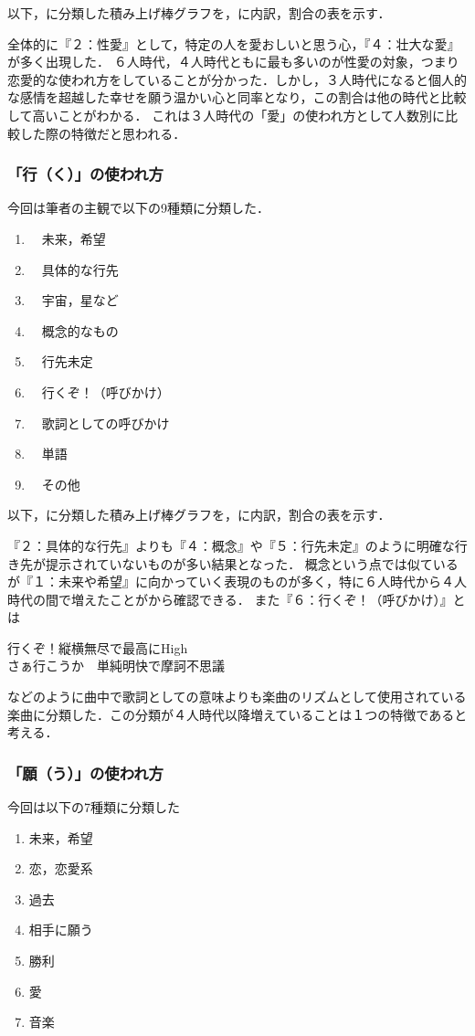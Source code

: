 以下，に分類した積み上げ棒グラフを，\protect{}に内訳，割合の表を示す．

全体的に『２：性愛』として，特定の人を愛おしいと思う心，『４：壮大な愛』が多く出現した．
６人時代，４人時代ともに最も多いのが性愛の対象，つまり恋愛的な使われ方をしていることが分かった．しかし，３人時代になると個人的な感情を超越した幸せを願う温かい心と同率となり，この割合は他の時代と比較して高いことがわかる．
これは３人時代の「愛」の使われ方として人数別に比較した際の特徴だと思われる．




\subsubsection{「行（く）」の使われ方}
今回は筆者の主観で以下の9種類に分類した．
\begin{enumerate}
	\item　未来，希望
	\item　具体的な行先
	\item　宇宙，星など
	\item　概念的なもの
	\item　行先未定
	\item　行くぞ！（呼びかけ）
	\item　歌詞としての呼びかけ
	\item　単語
	\item　その他
\end{enumerate}

以下，に分類した積み上げ棒グラフを，\protect{}に内訳，割合の表を示す．


『２：具体的な行先』よりも『４：概念』や『５：行先未定』のように明確な行き先が提示されていないものが多い結果となった．
概念という点では似ているが『１：未来や希望』に向かっていく表現のものが多く，特に６人時代から４人時代の間で増えたことが\protect{}から確認できる．
また『６：行くぞ！（呼びかけ）』とは
\begin{musequote}
	行くぞ！縦横無尽で最高にHigh\\
	さぁ行こうか　単純明快で摩訶不思議
\end{musequote}
などのように曲中で歌詞としての意味よりも楽曲のリズムとして使用されている楽曲に分類した．この分類が４人時代以降増えていることは１つの特徴であると考える．

\subsubsection{「願（う）」の使われ方}
今回は以下の7種類に分類した
\begin{enumerate}
	\item 未来，希望
	\item 恋，恋愛系
	\item 過去
	\item 相手に願う
	\item 勝利
	\item 愛
	\item 音楽
\end{enumerate}

